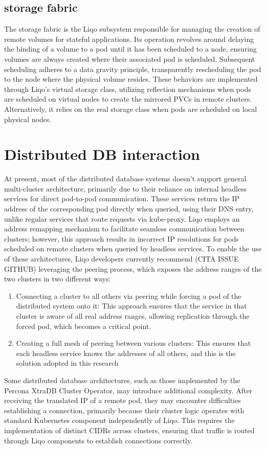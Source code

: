 \subsection{storage fabric}
The storage fabric is the Liqo subsystem responsible for managing the creation of remote volumes for stateful applications. Its operation revolves around delaying the binding of a volume to a pod until it has been scheduled to a node, ensuring volumes are always created where their associated pod is scheduled. Subsequent scheduling adheres to a data gravity principle, transparently rescheduling the pod to the node where the physical volume resides. These behaviors are implemented through Liqo's virtual storage class, utilizing reflection mechanisms when pods are scheduled on virtual nodes to create the mirrored PVCs in remote clusters. Alternatively, it relies on the real storage class when pods are scheduled on local physical nodes.

\section{Distributed DB interaction}
At present, most of the distributed database systems doesn't support general multi-cluster architecture, primarily due to their reliance on internal headless services for direct pod-to-pod communication. These services return the IP address of the corresponding pod directly when queried, using their DNS entry, unlike regular services that route requests via kube-proxy. Liqo employs an address remapping mechanism to facilitate seamless communication between clusters; however, this approach results in incorrect IP resolutions for pods scheduled on remote clusters when queried by headless services.
To enable the use of these architectures, Liqo developers currently recommend (CITA ISSUE GITHUB) leveraging the peering process, which exposes the address ranges of the two clusters in two different ways:
\begin{enumerate}
\item Connecting a cluster to all others via peering while forcing a pod of the distributed system onto it: This approach ensures that the service in that cluster is aware of all real address ranges, allowing replication through the forced pod, which becomes a critical point.
\item Creating a full mesh of peering between various clusters: This ensures that each headless service knows the addresses of all others, and this is the solution adopted in this research
\end{enumerate}
Some distributed database architectures, such as those implemented by the Percona XtraDB Cluster Operator, may introduce additional complexity. After receiving the translated IP of a remote pod, they may encounter difficulties establishing a connection, primarily because their cluster logic operates with standard Kubernetes component independently of Liqo. This requires the implementation of distinct CIDRs across clusters, ensuring that traffic is routed through Liqo components to establish connections correctly.